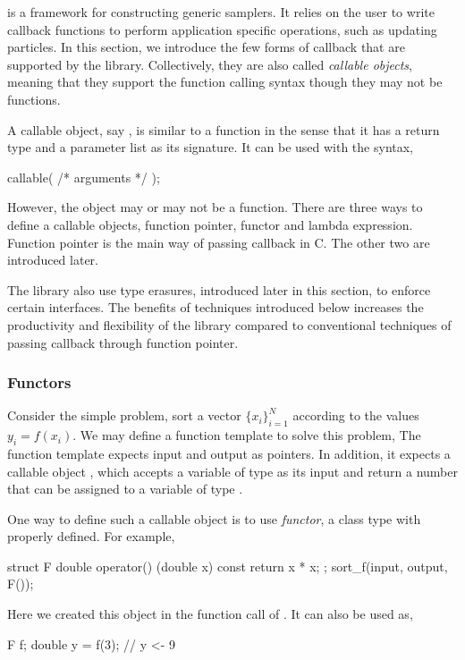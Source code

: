 \vsmc is a framework for constructing generic \smc samplers. It relies on the
user to write callback functions to perform application specific operations,
such as updating particles. In this section, we introduce the few forms of
callback that are supported by the library. Collectively, they are also called
\emph{callable objects}, meaning that they support the function calling syntax
though they may not be functions.

A callable object, say , is similar to a function in the
sense that it has a return type and a parameter list as its signature. It can
be used with the syntax,
\begin{cppcode}
callable( /* arguments */ );
\end{cppcode}
However, the object may or may not be a function. There are three ways to
define a callable objects, function pointer, functor and \cppoo lambda
expression. Function pointer is the main way of passing callback in C. The
other two are introduced later.

The library also use type erasures, introduced later in this section, to
enforce certain interfaces. The benefits of techniques introduced below
increases the productivity and flexibility of the library compared to
conventional techniques of passing callback through function pointer.

\subsubsection{Functors}
\label{ssub:Functors}

Consider the simple problem, sort a vector $\{x_i\}_{i=1}^N$ according to the
values $y_i = f(x_i)$. We may define a function template to solve this
problem,
The function template  expects input and output as pointers.
In addition, it expects a callable object , which accepts a
variable of type  as its input and return a number that can
be assigned to a variable of type .

One way to define such a callable object is to use \emph{functor}, a class
type with  properly defined. For example,
\begin{cppcode}
struct F
{
    double operator() (double x) const { return x * x; }
};
sort_f(input, output, F());
\end{cppcode}
Here we created this object in the function call of . It can
also be used as,
\begin{cppcode}
F f;
double y = f(3); // y <- 9
\end{cppcode}

